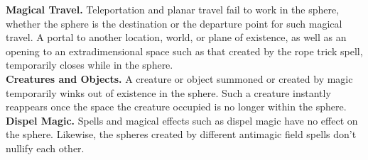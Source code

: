 \documentclass[11pt, A4paper, english]{article}
\begin{document}
\textbf{Magical Travel.} Teleportation and planar travel fail to work in the sphere, whether the sphere is the destination or the departure point for such magical travel. A portal to another location, world, or plane of existence, as well as an opening to an extradimensional space such as that created by the rope trick spell, temporarily closes while in the sphere. \\
\textbf{Creatures and Objects.} A creature or object summoned or created by magic temporarily winks out of existence in the sphere. Such a creature instantly reappears once the space the creature occupied is no longer within the sphere. \\
\textbf{Dispel Magic.} Spells and magical effects such as dispel magic have no effect on the sphere. Likewise, the spheres created by different antimagic field spells don’t nullify each other.
\end{document}
